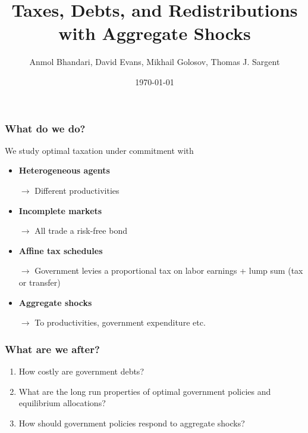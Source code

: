 \documentclass{beamer}
\title {Taxes, Debts,  and Redistributions with Aggregate Shocks}
\author{Anmol Bhandari, David Evans, Mikhail Golosov, Thomas J. Sargent}
\date{\today}
\begin{document}
%
\begin{frame}
\titlepage

\end{frame}

\begin{frame}
\frametitle{What do we do?}
We study optimal taxation under commitment with
\begin{itemize}
 \item \textbf{Heterogeneous agents}

 \quad \color{red}$\rightarrow$ \color{black} Different productivities

 \item \textbf{Incomplete markets}

 \quad \color{red}$\rightarrow$ \color{black}All trade a risk-free bond

 \item \textbf{Affine tax schedules}

 \quad \color{red}$\rightarrow$ \color{black}Government levies a proportional tax on labor earnings + lump sum (tax or transfer)

 \item \textbf{Aggregate shocks}

 \quad \color{red}$\rightarrow$ \color{black} To productivities, government expenditure etc.

 \end{itemize}
\end{frame}


\begin{frame}
\frametitle{What are we after?}

\begin{enumerate}
 \item How costly are government debts?
 \item What are the long run properties of optimal government policies and equilibrium allocations?
\item How should government policies respond to aggregate shocks?
\end{enumerate}

\end{frame}
\end{document}
